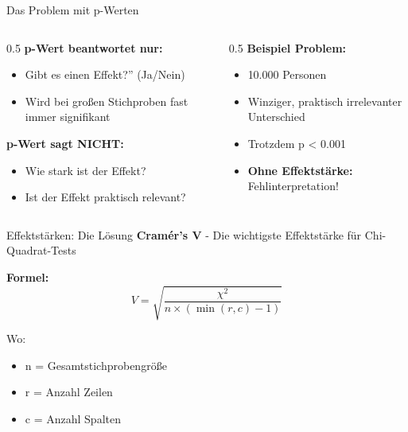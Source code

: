 \documentclass[
  ignorenonframetext,
]{beamer}
\providecommand{\tightlist}{%
  \setlength{\itemsep}{0pt}\setlength{\parskip}{0pt}}
\begin{document}
\begin{frame}{Das Problem mit p-Werten}
\protect{}\label{das-problem-mit-p-werten}
\begin{columns}[T]
\begin{column}{0.5\linewidth}
\textbf{p-Wert beantwortet nur:}

\begin{itemize}
\tightlist
\item
  Gibt es einen Effekt?'' (Ja/Nein)
\item
  Wird bei großen Stichproben fast immer signifikant
\end{itemize}

\textbf{p-Wert sagt NICHT:}

\begin{itemize}
\tightlist
\item
  Wie stark ist der Effekt?
\item
  Ist der Effekt praktisch relevant?
\end{itemize}
\end{column}

\begin{column}{0.5\linewidth}
\textbf{Beispiel Problem:}

\begin{itemize}
\tightlist
\item
  10.000 Personen
\item
  Winziger, praktisch irrelevanter Unterschied
\item
  Trotzdem p \textless{} 0.001
\item
  \textbf{Ohne Effektstärke:} Fehlinterpretation!
\end{itemize}
\end{column}
\end{columns}
\end{frame}

\begin{frame}{Effektstärken: Die Lösung}
\protect{}\label{effektstuxe4rken-die-luxf6sung}
\textbf{Cramér's V} - Die wichtigste Effektstärke für Chi-Quadrat-Tests

\textbf{Formel:} \[V = \sqrt{\frac{\chi^2}{n \times (\min(r,c) - 1)}}\]

Wo:

\begin{itemize}
\tightlist
\item
  n = Gesamtstichprobengröße
\item
  r = Anzahl Zeilen
\item
  c = Anzahl Spalten
\end{itemize}
\end{frame}
\end{document}
